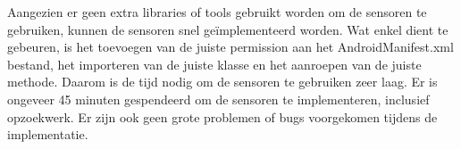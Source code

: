 Aangezien er geen extra libraries of tools gebruikt worden om de sensoren te gebruiken, 
kunnen de sensoren snel geïmplementeerd worden. Wat enkel dient te gebeuren, 
is het toevoegen van de juiste permission aan het AndroidManifest.xml bestand,
het importeren van de juiste klasse en het aanroepen van de juiste methode.
Daarom is de tijd nodig om de sensoren te gebruiken zeer laag. 
Er is ongeveer 45 minuten gespendeerd om de sensoren te implementeren, inclusief 
opzoekwerk. Er zijn ook geen grote problemen of 
bugs voorgekomen tijdens de implementatie.


